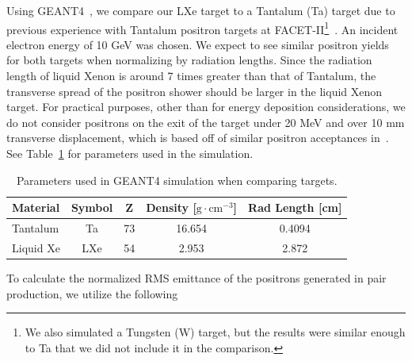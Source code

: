 \documentclass[%
reprint,
nofootinbib,
amsmath, amssymb,
aps,
floatfix,
]{revtex4-2}
\begin{document}
Using GEANT4~\cite{Geant4}, we compare our LXe target to a Tantalum (Ta) target due to previous
experience with Tantalum positron targets at FACET-II\footnote{We also simulated a Tungsten (W) target, but the results were similar enough to 
Ta that we did not include it in the comparison.}~\cite{Fujii2019}.
An incident electron energy of 10 GeV was chosen.
We expect to see similar positron yields for both targets when normalizing by radiation lengths.
Since the radiation length of liquid Xenon is around 7 times greater than that of Tantalum, 
the transverse spread of the positron shower
should be larger in the liquid Xenon target.  For practical purposes, other than for energy deposition considerations,
we do not consider positrons on the exit of the target under 20 MeV and over 10 mm transverse displacement,
which is based off of similar positron acceptances in~\cite{Tang1995, Sheppard2003}.
See Table~\ref{tab:G4Params} for parameters used in the simulation.
\begin{table}[h]
    \centering
    \begin{tabular}{lcccc}
        \hline \hline
        \textbf{Material} & \textbf{Symbol} & \textbf{Z} & \textbf{Density} [$\textrm{g} \cdot \textrm{cm}^{-3} $] & \textbf{Rad Length} [cm] \\
        \hline
        Tantalum & Ta & 73 & 16.654 & 0.4094 \\
        Liquid Xe & LXe & 54 & 2.953 & 2.872 \\
        \hline \hline
    \end{tabular}
    \caption{\label{tab:G4Params}Parameters used in GEANT4 simulation when comparing targets.}
\end{table}

To calculate the normalized RMS emittance of the positrons generated in pair production, 
we utilize the following~\cite{Floettmann2003}
\end{document}
